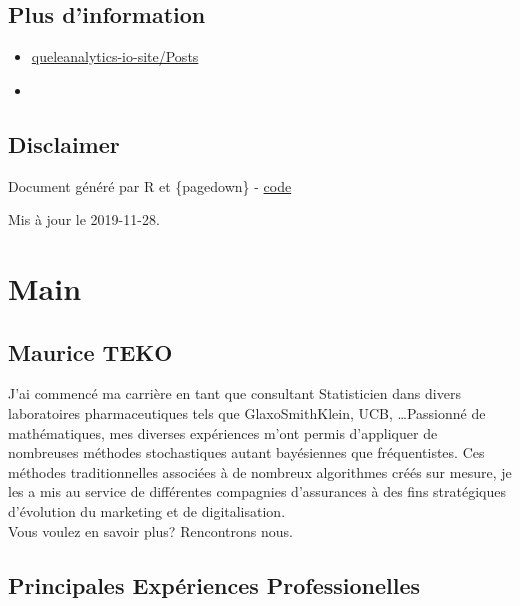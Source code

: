 \documentclass[]{article}
\begin{document}
\hypertarget{more-info}{%
\subsection{Plus d'information}\label{more-info}}

\begin{itemize}
\item
  \href{https://github.com/tekomaurice/queleanalytics-io-site/Posts/}{queleanalytics-io-site/Posts
  }
\item
\end{itemize}

\hypertarget{disclaimer}{%
\subsection{Disclaimer}\label{disclaimer}}

Document généré par R et \{pagedown\} -
\href{https://github.com/tekomaurice/cv}{code }

Mis à jour le 2019-11-28.

\hypertarget{main}{%
\section{Main}\label{main}}

\hypertarget{title}{%
\subsection{Maurice TEKO}\label{title}}

J'ai commencé ma carrière en tant que consultant Statisticien dans
divers laboratoires pharmaceutiques tels que GlaxoSmithKlein, UCB,
\ldots{}Passionné de mathématiques, mes diverses expériences m'ont
permis d'appliquer de nombreuses méthodes stochastiques autant
bayésiennes que fréquentistes. Ces méthodes traditionnelles associées à
de nombreux algorithmes créés sur mesure, je les a mis au service de
différentes compagnies d'assurances à des fins stratégiques d'évolution
du marketing et de digitalisation.\\
Vous voulez en savoir plus? Rencontrons nous.

\hypertarget{principales-expuxe9riences-professionelles}{%
\subsection{Principales Expériences
Professionelles}\label{principales-expuxe9riences-professionelles}}
\end{document}
